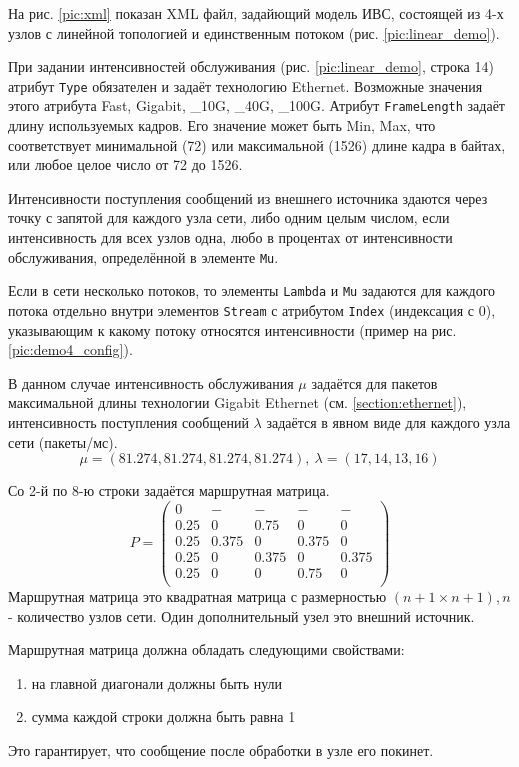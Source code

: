 \documentclass[oneside, draft, 14pt, a4paper]{extreport}
\begin{document}
На рис. \ref{pic:xml} показан XML файл, задайющий модель ИВС, состоящей из 4-х узлов с линейной топологией и единственным потоком (рис. \ref{pic:linear_demo}).

При задании интенсивностей обслуживания (рис. \ref{pic:linear_demo}, строка 14) атрибут \verb:Type: обязателен и задаёт технологию Ethernet. Возможные значения этого атрибута Fast, Gigabit, \_10G, \_40G, \_100G. Атрибут \verb:FrameLength: задаёт длину используемых кадров. Его значение может быть  Min, Max, что соответствует минимальной (72) или максимальной (1526) длине кадра в байтах, или любое целое число от 72 до 1526.

Интенсивности поступления сообщений из внешнего источника здаются через точку с запятой для каждого узла сети, либо одним целым числом, если интенсивность для всех узлов одна, любо в процентах от интенсивности обслуживания, определённой в элементе \verb:Mu:.

Если в сети несколько потоков, то элементы \verb:Lambda: и \verb:Mu: задаются для каждого потока отдельно внутри элементов \verb:Stream: с атрибутом \verb:Index: (индексация с 0), указывающим к какому потоку относятся интенсивности (пример на рис. \ref{pic:demo4_config}).

В данном случае интенсивность обслуживания \( \mu \)  задаётся для пакетов максимальной длины технологии Gigabit Ethernet (см. \ref{section:ethernet}), интенсивность поступления сообщений \( \lambda \) задаётся в явном виде для каждого узла сети (пакеты/мс).
\[ \mu = (81.274, 81.274, 81.274, 81.274), \: \lambda = (17, 14, 13, 16) \]

Со 2-й по 8-ю строки задаётся маршрутная матрица.
\[ P = \left(\begin{matrix}
                0 & - & - & - & - \\
                0.25 & 0 & 0.75 & 0 & 0 \\
                0.25 & 0.375 & 0 & 0.375 & 0 \\
                0.25 & 0 & 0.375 & 0 & 0.375 \\
                0.25 & 0 & 0 & 0.75 & 0 \\
            \end{matrix}\right) \]
Маршрутная матрица это квадратная матрица с размерностью \( (n + 1 \times n + 1), n \) - количество узлов сети. Один дополнительный узел это внешний источник.

\noindent Маршрутная матрица должна обладать следующими свойствами:
\begin{enumerate}
	\item на главной диагонали должны быть нули
	\item сумма каждой строки должна быть равна 1
\end{enumerate}
Это гарантирует, что сообщение после обработки в узле его покинет.
\end{document}
